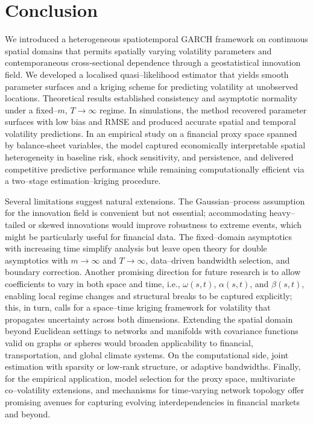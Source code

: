 \documentclass[fleqn,11pt]{article}
\begin{document}
	
\section{Conclusion}\label{sec:conclusion}

We introduced a heterogeneous spatiotemporal GARCH framework on continuous spatial domains that permits spatially varying volatility parameters and contemporaneous cross‐sectional dependence through a geostatistical innovation field. We developed a localised quasi–likelihood estimator that yields smooth parameter surfaces and a kriging scheme for predicting volatility at unobserved locations. Theoretical results established consistency and asymptotic normality under a fixed–$m$, $T\to\infty$ regime. In simulations, the method recovered parameter surfaces with low bias and RMSE and produced accurate spatial and temporal volatility predictions. In an empirical study on a financial proxy space spanned by balance‐sheet variables, the model captured economically interpretable spatial heterogeneity in baseline risk, shock sensitivity, and persistence, and delivered competitive predictive performance while remaining computationally efficient via a two–stage estimation–kriging procedure.

Several limitations suggest natural extensions. The Gaussian–process assumption for the innovation field is convenient but not essential; accommodating heavy–tailed or skewed innovations would improve robustness to extreme events, which might be particularly useful for financial data. The fixed–domain asymptotics with increasing time simplify analysis but leave open theory for double asymptotics with $m\to\infty$ and $T\to\infty$, data–driven bandwidth selection, and boundary correction. Another promising direction for future research is to allow coefficients to vary in both space and time, i.e., $\omega(s,t)$, $\alpha(s,t)$, and $\beta(s,t)$, enabling local regime changes and structural breaks to be captured explicitly; this, in turn, calls for a space–time kriging framework for volatility that propagates uncertainty across both dimensions. Extending the spatial domain beyond Euclidean settings to networks and manifolds with covariance functions valid on graphs or spheres would broaden applicability to financial, transportation, and global climate systems. On the computational side, joint estimation with sparsity or low‐rank structure, or adaptive bandwidths. Finally, for the empirical application, model selection for the proxy space, multivariate co–volatility extensions, and mechanisms for time‐varying network topology offer promising avenues for capturing evolving interdependencies in financial markets and beyond.
\end{document}
